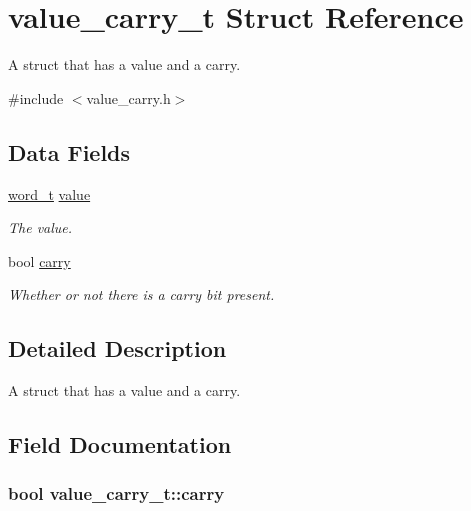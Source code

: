 \hypertarget{structvalue__carry__t}{}\section{value\+\_\+carry\+\_\+t Struct Reference}
\label{structvalue__carry__t}


A struct that has a value and a carry.  




{\ttfamily \#include $<$value\+\_\+carry.\+h$>$}

\subsection*{Data Fields}
\begin{DoxyCompactItemize}
\item 
\hyperlink{global_8h_a0e7744482eed560726581dae7d3cb8b2}{word\+\_\+t} \hyperlink{structvalue__carry__t_a4ee942fb80f5e029be0e70fb36fbe7d2}{value}
\begin{DoxyCompactList}\small\item\em The value. \end{DoxyCompactList}\item 
bool \hyperlink{structvalue__carry__t_acc16f68935549d72338a641a70b7a002}{carry}
\begin{DoxyCompactList}\small\item\em Whether or not there is a carry bit present. \end{DoxyCompactList}\end{DoxyCompactItemize}


\subsection{Detailed Description}
A struct that has a value and a carry. 

\subsection{Field Documentation}
\subsubsection[{\texorpdfstring{carry}{carry}}]{\setlength{\rightskip}{0pt plus 5cm}bool value\+\_\+carry\+\_\+t\+::carry}\hypertarget{structvalue__carry__t_acc16f68935549d72338a641a70b7a002}{}\label{structvalue__carry__t_acc16f68935549d72338a641a70b7a002}


